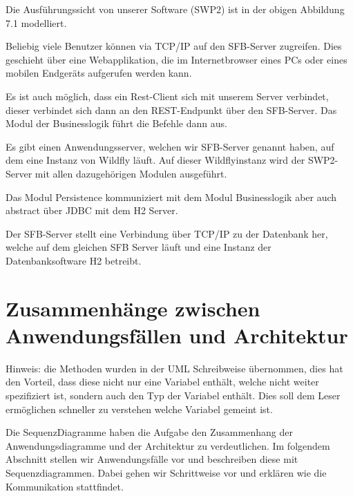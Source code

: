 \documentclass[enabledeprecatedfontcommands,fontsize=12pt,paper=a4,twoside]{scrartcl}
\begin{document}
{{ Die Ausführungssicht von unserer Software (SWP2) ist in der obigen Abbildung
  7.1 modelliert.

Beliebig viele Benutzer können via TCP/IP auf den SFB-Server zugreifen. Dies
geschieht über eine Webapplikation, die im Internetbrowser eines PCs oder eines
mobilen Endgeräts aufgerufen werden kann.

Es ist auch möglich, dass ein Rest-Client sich mit unserem Server verbindet,
dieser verbindet sich dann an den REST-Endpunkt über den SFB-Server. Das Modul
der Businesslogik führt die Befehle dann aus.

Es gibt einen Anwendungsserver, welchen wir SFB-Server genannt haben, auf dem
eine Instanz von Wildfly läuft. Auf dieser Wildflyinstanz wird der SWP2-Server
mit allen dazugehörigen Modulen ausgeführt.

Das Modul Persistence kommuniziert mit dem Modul Businesslogik aber auch
\glqq abstract\grqq{} über JDBC mit dem H2 Server.

Der SFB-Server stellt eine Verbindung über TCP/IP zu der
Datenbank her, welche auf dem gleichen SFB Server läuft und eine Instanz der Datenbanksoftware H2 betreibt.
}

\section[Zusammenhänge zwischen Anwendungsfällen und Architektur]{Zusammenhänge zwischen Anwendungsfällen und Architektur}
\label{sec:anwendungsfaelle}

Hinweis: die Methoden wurden in der UML Schreibweise übernommen, dies hat den
Vorteil, dass diese nicht nur eine Variabel enthält, welche nicht weiter
spezifiziert ist, sondern auch den Typ der Variabel enthält. Dies soll dem
Leser ermöglichen schneller zu verstehen welche Variabel gemeint ist.


Die SequenzDiagramme haben die Aufgabe den Zusammenhang der Anwendungsdiagramme
und der Architektur zu verdeutlichen. Im folgendem Abschnitt stellen wir
Anwendungsfälle vor und beschreiben diese mit Sequenzdiagrammen. Dabei gehen wir
Schrittweise vor und erklären wie die Kommunikation stattfindet.

}
\end{document}

